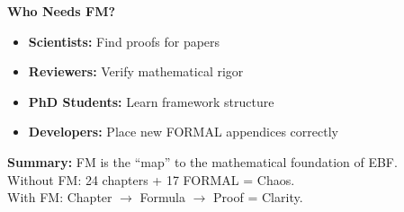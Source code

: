 \begin{tcolorbox}[colback=orange!5!white, colframe=orange!75!black,
    title=\textbf{Motivation: Why Do We Need This Appendix?}]
\vspace{0.5em}
\textbf{Who Needs FM?}

\begin{itemize}[nosep]
    \item \textbf{Scientists:} Find proofs for papers
    \item \textbf{Reviewers:} Verify mathematical rigor
    \item \textbf{PhD Students:} Learn framework structure
    \item \textbf{Developers:} Place new FORMAL appendices correctly
\end{itemize}

\vspace{0.5em}
\textbf{Summary:} FM is the ``map'' to the mathematical foundation of EBF.\\
Without FM: 24 chapters + 17 FORMAL = Chaos.\\
With FM: Chapter $\rightarrow$ Formula $\rightarrow$ Proof = Clarity.

\end{tcolorbox}

